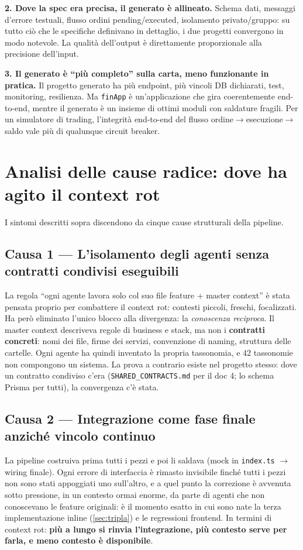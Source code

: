 \documentclass[11pt,a4paper]{article}
\newcommand{\file}[1]{\texttt{\small #1}}
\begin{document}
\textbf{2. Dove la spec era precisa, il generato \`e allineato.} Schema dati, messaggi d'errore testuali, flusso ordini pending/executed, isolamento privato/gruppo: su tutto ci\`o che le specifiche definivano in dettaglio, i due progetti convergono in modo notevole. La qualit\`a dell'output \`e direttamente proporzionale alla precisione dell'input.

\textbf{3. Il generato \`e ``pi\`u completo'' sulla carta, meno funzionante in pratica.} Il progetto generato ha pi\`u endpoint, pi\`u vincoli DB dichiarati, test, monitoring, resilienza. Ma \file{finApp} \`e un'applicazione che gira coerentemente end-to-end, mentre il generato \`e un insieme di ottimi moduli con saldature fragili. Per un simulatore di trading, l'integrit\`a end-to-end del flusso ordine$\to$esecuzione$\to$saldo vale pi\`u di qualunque circuit breaker.

\section{Analisi delle cause radice: dove ha agito il context rot}

I sintomi descritti sopra discendono da cinque cause strutturali della pipeline.

\subsection{Causa 1 --- L'isolamento degli agenti senza contratti condivisi eseguibili}
La regola ``ogni agente lavora solo col suo file feature + master context'' \`e stata pensata proprio per combattere il context rot: contesti piccoli, freschi, focalizzati. Ha per\`o eliminato l'unico blocco alla divergenza: la \emph{conoscenza reciproca}. Il master context descriveva regole di business e stack, ma non i \textbf{contratti concreti}: nomi dei file, firme dei servizi, convenzione di naming, struttura delle cartelle. Ogni agente ha quindi inventato la propria tassonomia, e 42 tassonomie non compongono un sistema. La prova a contrario esiste nel progetto stesso: dove un contratto condiviso c'era (\file{SHARED\_CONTRACTS.md} per il doc 4; lo schema Prisma per tutti), la convergenza c'\`e stata.

\subsection{Causa 2 --- Integrazione come fase finale anzich\'e vincolo continuo}
La pipeline costruiva prima tutti i pezzi e poi li saldava (mock in \file{index.ts} $\to$ wiring finale). Ogni errore di interfaccia \`e rimasto invisibile finch\'e tutti i pezzi non sono stati appoggiati uno sull'altro, e a quel punto la correzione \`e avvenuta sotto pressione, in un contesto ormai enorme, da parte di agenti che non conoscevano le feature originali: \`e il momento esatto in cui sono nate la terza implementazione inline (\ref{sec:tripla}) e le regressioni frontend. In termini di context rot: \textbf{pi\`u a lungo si rinvia l'integrazione, pi\`u contesto serve per farla, e meno contesto \`e disponibile}.
\end{document}
